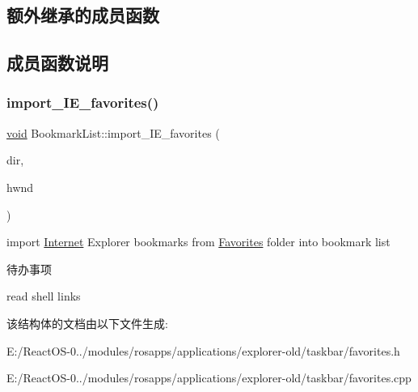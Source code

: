 \subsection*{额外继承的成员函数}


\subsection{成员函数说明}
\mbox{\label{struct_bookmark_list_a473d8d4b6ddf51a2b2c01fa5de6045ea}} 
\subsubsection{\texorpdfstring{import\+\_\+\+I\+E\+\_\+favorites()}{import\_IE\_favorites()}}
{\footnotesize\ttfamily \hyperlink{interfacevoid}{void} Bookmark\+List\+::import\+\_\+\+I\+E\+\_\+favorites (\begin{DoxyParamCaption}\item[{\hyperlink{interfacestruct}{struct} \hyperlink{struct_shell_directory}{Shell\+Directory} \&}]{dir,  }\item[{\hyperlink{interfacevoid}{H\+W\+ND}}]{hwnd }\end{DoxyParamCaption})}



import \hyperlink{class_internet}{Internet} Explorer bookmarks from \hyperlink{struct_favorites}{Favorites} folder into bookmark list 

\begin{DoxyRefDesc}{待办事项}
\item[\hyperlink{todo__todo000059}{待办事项}]read shell links \end{DoxyRefDesc}


该结构体的文档由以下文件生成\+:\begin{DoxyCompactItemize}
\item 
E\+:/\+React\+O\+S-\/0../modules/rosapps/applications/explorer-\/old/taskbar/favorites.\+h\item 
E\+:/\+React\+O\+S-\/0../modules/rosapps/applications/explorer-\/old/taskbar/favorites.\+cpp\end{DoxyCompactItemize}
